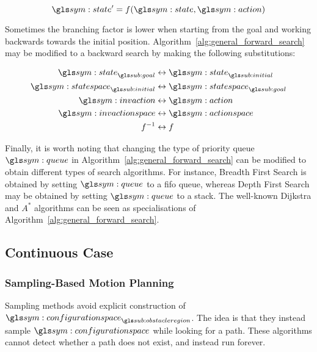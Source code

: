 		\begin{equation}
			\state' = f(\state, \action)
		\end{equation}

		Sometimes the branching factor is lower when starting from the goal and
		working backwards towards the initial position.
		Algorithm~\ref{alg:general_forward_search} may be modified to a backward
		search by making the following substitutions:

		\begin{align}
			\begin{split}
				\state_{\goal} &\leftrightarrow \state_{\initial} \\
				\statespace_{\initial} &\leftrightarrow \statespace_{\goal} \\
				\invaction &\leftrightarrow \action\\
				\invactionspace &\leftrightarrow \actionspace\\
				f^{-1} &\leftrightarrow f
			\end{split}
		\end{align}

		Finally, it is worth noting that changing the type of priority queue
		$\queue$ in Algorithm~\ref{alg:general_forward_search} can be modified
		to obtain different types of search algorithms. For instance, Breadth
		First Search is obtained by setting $\queue$ to a \gls{fifo} queue, whereas
		Depth First Search may be obtained by setting $\queue$ to a
		stack. The
		well-known Dijkstra and $A^*$ algorithms can be seen as specialisations
		of Algorithm~\ref{alg:general_forward_search}.


	\subsection{Continuous Case}%
	\label{sec:continuous_case}

		\subsubsection{Sampling-Based Motion Planning}%
		\label{sec:sampling_based_motion_planning}

			Sampling methods avoid explicit construction of
			$\configurationspace_{\obstacleregion}$. The idea is that they
			instead sample $\configurationspace$ while looking for a path. These
			algorithms cannot detect whether a path does not exist, and instead
			run forever.

